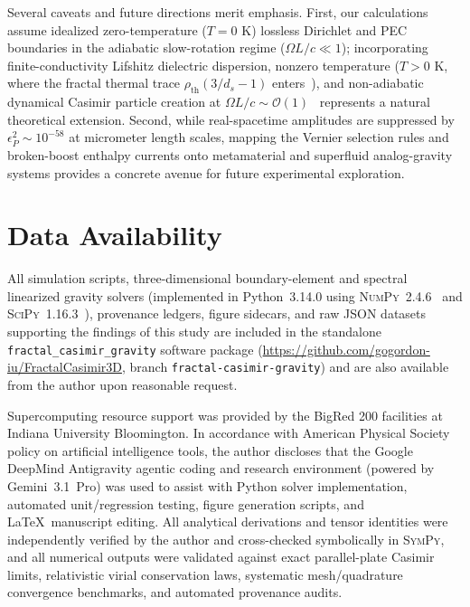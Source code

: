 \documentclass[aps,prd,twocolumn,10pt,showkeys,nofootinbib,floatfix,longbibliography]{revtex4-2}
\begin{document}
Several caveats and future directions merit emphasis. First, our calculations assume idealized zero-temperature ($T=0\text{ K}$) lossless Dirichlet and PEC boundaries in the adiabatic slow-rotation regime ($\Omega L/c \ll 1$); incorporating finite-conductivity Lifshitz dielectric dispersion, nonzero temperature ($T > 0\text{ K}$, where the fractal thermal trace $\rho_{\mathrm{th}}(3/d_s - 1)$ enters~\cite{akkermans2010,gordon2026prd}), and non-adiabatic dynamical Casimir particle creation at $\Omega L/c \sim \mathcal{O}(1)$~\cite{deoliveira2026entropy} represents a natural theoretical extension. Second, while real-spacetime amplitudes are suppressed by $\epsilon_P^2 \sim 10^{-58}$ at micrometer length scales, mapping the Vernier selection rules and broken-boost enthalpy currents onto metamaterial and superfluid analog-gravity systems provides a concrete avenue for future experimental exploration.

\section*{Data Availability}
All simulation scripts, three-dimensional boundary-element and spectral linearized gravity solvers (implemented in Python~3.14.0 using \textsc{NumPy}~2.4.6~\cite{harris2020numpy} and \textsc{SciPy}~1.16.3~\cite{virtanen2020scipy}), provenance ledgers, figure sidecars, and raw JSON datasets supporting the findings of this study are included in the standalone \texttt{fractal\_casimir\_gravity} software package (\url{https://github.com/gogordon-iu/FractalCasimir3D}, branch \texttt{fractal-casimir-gravity}) and are also available from the author upon reasonable request.

\begin{acknowledgments}
Supercomputing resource support was provided by the BigRed 200 facilities at Indiana University Bloomington. In accordance with American Physical Society policy on artificial intelligence tools, the author discloses that the Google DeepMind Antigravity agentic coding and research environment (powered by Gemini~3.1~Pro) was used to assist with Python solver implementation, automated unit/regression testing, figure generation scripts, and \LaTeX\ manuscript editing. All analytical derivations and tensor identities were independently verified by the author and cross-checked symbolically in \textsc{SymPy}, and all numerical outputs were validated against exact parallel-plate Casimir limits, relativistic virial conservation laws, systematic mesh/quadrature convergence benchmarks, and automated provenance audits.
\end{acknowledgments}
\end{document}
